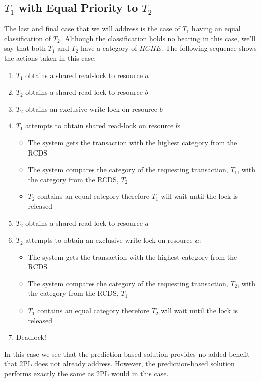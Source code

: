\documentclass[conference]{IEEEtran}
\begin{document}
\subsection{$T_{1}$ with Equal Priority to $T_{2}$}
\label{sec:t1_equal_to_t2}
The last and final case that we will address is the case of $T_{1}$ having an equal classification of $T_{2}$. Although the classification holds no bearing in this case, we'll say that both $T_{1}$ and $T_{2}$ have a category of $HCHE$. The following sequence shows the actions taken in this case:

\begin{enumerate}
  \item $T_{1}$ obtains a shared read-lock to resource $a$
  \item $T_{2}$ obtains a shared read-lock to resource $b$
  \item $T_{2}$ obtains an exclusive write-lock on resource $b$
  \item $T_{1}$ attempts to obtain shared read-lock on resource $b$:
    \begin{itemize}
        \item The system gets the transaction with the highest category from the RCDS
        \item The system compares the category of the requesting transaction, $T_{1}$, with the category from the RCDS, $T_{2}$
        \item $T_{2}$ contains an equal category therefore $T_{1}$ will wait until the lock is released
    \end{itemize}
  \item $T_{2}$ obtains a shared read-lock to resource $a$
  \item $T_{2}$ attempts to obtain an exclusive write-lock on resource $a$:
    \begin{itemize}
        \item The system gets the transaction with the highest category from the RCDS
        \item The system compares the category of the requesting transaction, $T_{2}$, with the category from the RCDS, $T_{1}$
        \item $T_{1}$ contains an equal category therefore $T_{2}$ will wait until the lock is released
    \end{itemize}    
  \item Deadlock!
\end{enumerate}

In this case we see that the prediction-based solution provides no added benefit that 2PL does not already address. However, the prediction-based solution performs exactly the same as 2PL would in this case.
\end{document}
